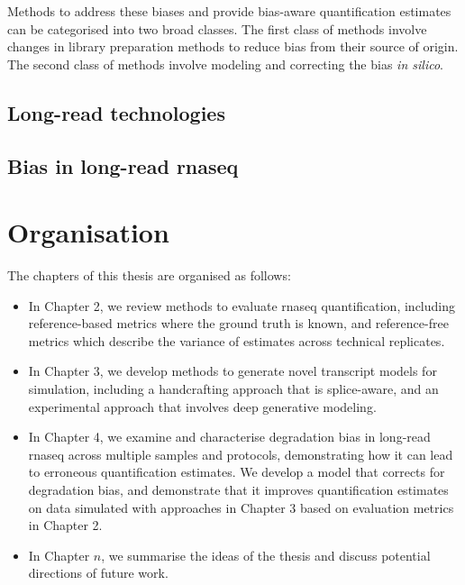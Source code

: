 Methods to address these biases and provide bias-aware quantification estimates can be categorised into two broad classes. The first class of methods involve changes in library preparation methods to reduce bias from their source of origin. The second class of methods involve modeling and correcting the bias \textit{in silico}. 

\subsection{Long-read technologies}

\lipsum[1]

\subsection{Bias in long-read \gls{rnaseq}}

\lipsum[3]

\section{Organisation}

The chapters of this thesis are organised as follows:
\begin{itemize}
    \item In Chapter 2, we review methods to evaluate \gls{rnaseq} quantification, including reference-based metrics where the ground truth is known, and reference-free metrics which describe the variance of estimates across technical replicates. 
    \item In Chapter 3, we develop methods to generate novel transcript models for simulation, including a handcrafting approach that is splice-aware, and an experimental approach that involves deep generative modeling.
    \item In Chapter 4, we examine and characterise degradation bias in long-read \gls{rnaseq} across multiple samples and protocols, demonstrating how it can lead to erroneous quantification estimates. We develop a model that corrects for degradation bias, and demonstrate that it improves quantification estimates on data simulated with approaches in Chapter 3 based on evaluation metrics in Chapter 2. 
    \item In Chapter $n$, we summarise the ideas of the thesis and discuss potential directions of future work. 
\end{itemize}